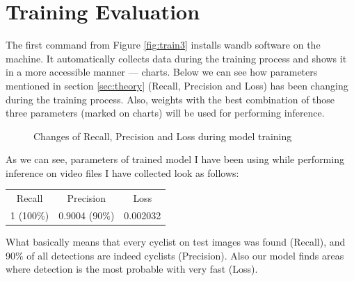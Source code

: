 \section{Training Evaluation}
\label{sec:eval}
The first command from Figure \ref{fig:train3} installs wandb software on the machine. It automatically collects data during the training process and shows it in a more accessible manner --- charts. Below we can see how parameters mentioned in section \ref{sec:theory} (Recall, Precision and Loss) has been changing during the training process. Also, weights with the best combination of those three parameters (marked on charts) will be used for performing inference.
\begin{figure} [h]
    \centering
    \caption{Changes of Recall, Precision and Loss during model training}
    \label{fig:eval1}
\end{figure}
\newline As we can see, parameters of trained model I have been using while performing inference on video files I have collected look as follows:
\begin{center}
    \begin{tabular}{ccc}
    Recall    & Precision     & Loss     \\
    1 (100\%) & 0.9004 (90\%) & 0.002032
    \end{tabular}
\end{center}
What basically means that every cyclist on test images was found (Recall), and 90\% of all detections are indeed cyclists (Precision). Also our model finds areas where detection is the most probable with very fast (Loss).

